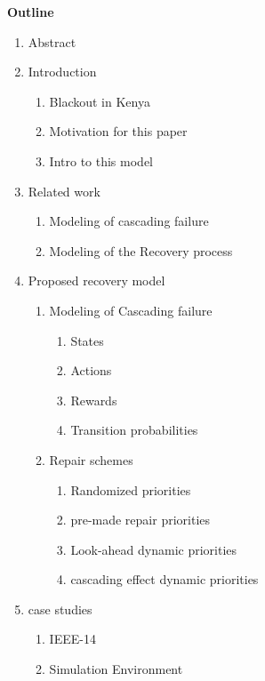 \textbf{Outline}
\begin{enumerate}
  \item  Abstract
  \item Introduction 
  \begin{enumerate}
          \item Blackout in Kenya
          \item Motivation for this paper
          \item Intro to this model
        \end{enumerate}
  \item Related work
  \begin{enumerate}
          \item Modeling of cascading failure
          \item Modeling of the Recovery process
        \end{enumerate}
  \item Proposed recovery model
  \begin{enumerate}
          \item Modeling of Cascading failure
          \begin{enumerate}
              \item States
              \item Actions
              \item Rewards
              \item Transition probabilities
          \end{enumerate}
          \item Repair schemes
          \begin{enumerate}
              \item Randomized priorities
              \item pre-made repair priorities
              \item Look-ahead dynamic priorities
              \item cascading effect dynamic priorities
          \end{enumerate}
        \end{enumerate}
  \item case studies
  \begin{enumerate}
          \item IEEE-14
          \item Simulation Environment

\end{enumerate}
\end{enumerate}
